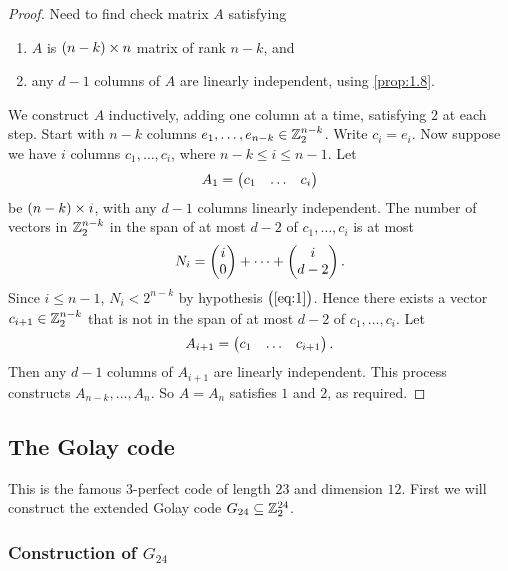\begin{proof}
Need to find check matrix $ A $ satisfying
\begin{enumerate}
\item $ A $ is $ \br{n - k} \times n $ matrix of rank $ n - k $, and
\item any $ d - 1 $ columns of $ A $ are linearly independent, using \ref{prop:1.8}.
\end{enumerate}
We construct $ A $ inductively, adding one column at a time, satisfying $ 2 $ at each step. Start with $ n - k $ columns $ e_1, \dots, e_{n - k} \in \mathbb{Z}_2^{n - k} $. Write $ c_i = e_i $. Now suppose we have $ i $ columns $ c_1, \dots, c_i $, where $ n - k \le i \le n - 1 $. Let
$$ A_1 = \onebythree{c_1}{\dots}{c_i} $$
be $ \br{n - k} \times i $, with any $ d - 1 $ columns linearly independent. The number of vectors in $ \mathbb{Z}_2^{n - k} $ in the span of at most $ d - 2 $ of $ c_1, \dots, c_i $ is at most
$$ N_i = \begin{pmatrix} i \\ 0 \end{pmatrix} + \dots + \begin{pmatrix} i \\ d - 2 \end{pmatrix}. $$
Since $ i \le n - 1 $, $ N_i < 2^{n - k} $ by hypothesis $ \br{\ref{eq:1}} $. Hence there exists a vector $ c_{i + 1} \in \mathbb{Z}_2^{n - k} $ that is not in the span of at most $ d - 2 $ of $ c_1, \dots, c_i $. Let
$$ A_{i + 1} = \onebythree{c_1}{\dots}{c_{i + 1}}. $$
Then any $ d - 1 $ columns of $ A_{i + 1} $ are linearly independent. This process constructs $ A_{n - k}, \dots, A_n $. So $ A = A_n $ satisfies $ 1 $ and $ 2 $, as required.
\end{proof}

\pagebreak

\subsection{The Golay code}


This is the famous $ 3 $-perfect code of length $ 23 $ and dimension $ 12 $. First we will construct the extended Golay code $ G_{24} \subseteq \mathbb{Z}_2^{24} $.

\subsubsection{Construction of \texorpdfstring{$ G_{24} $}{G24}}

